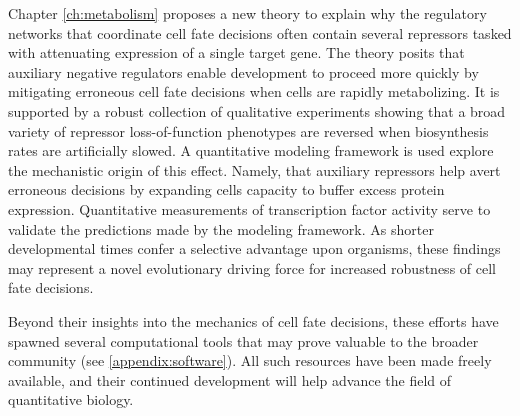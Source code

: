 Chapter \ref{ch:metabolism} proposes a new theory to explain why the regulatory networks that coordinate cell fate decisions often contain several repressors tasked with attenuating expression of a single target gene. The theory posits that auxiliary negative regulators enable development to proceed more quickly by mitigating erroneous cell fate decisions when cells are rapidly metabolizing. It is supported by a robust collection of qualitative experiments showing that a broad variety of repressor loss-of-function phenotypes are reversed when biosynthesis rates are artificially slowed. A quantitative modeling framework is used explore the mechanistic origin of this effect. Namely, that auxiliary repressors help avert erroneous decisions by expanding cells capacity to buffer excess protein expression. Quantitative measurements of transcription factor activity serve to validate the predictions made by the modeling framework. As shorter developmental times confer a selective advantage upon organisms, these findings may represent a novel evolutionary driving force for increased robustness of cell fate decisions.

Beyond their insights into the mechanics of cell fate decisions, these efforts have spawned several computational tools that may prove valuable to the broader community (see \ref{appendix:software}). All such resources have been made freely available, and their continued development will help advance the field of quantitative biology.